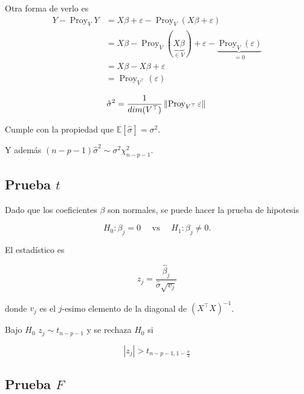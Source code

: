 \documentclass[
  12pt,
]{book}
\theoremstyle{definition}
\theoremstyle{definition}
\theoremstyle{definition}
\theoremstyle{remark}
\begin{document}
Otra forma de verlo es
\begin{align*}
Y-\operatorname{Proy}_{V}Y  
&= X\beta + \varepsilon -  \operatorname{Proy}_{V}( X\beta + \varepsilon) \\
&= X\beta - \operatorname{Proy}_{V}( \underbrace{X\beta}_{\in V}) + \varepsilon - \underbrace{\operatorname{Proy}_{V}( \varepsilon)}_{=0} \\
&= X\beta -X\beta + \varepsilon \\
&=  \operatorname{Proy}_{V^{\top}}( \varepsilon)
 \end{align*}

\begin{equation*}
\hat{\sigma}^{2} 
= \frac{1}{dim(V^{\top})}\left\Vert \operatorname{Proy}_{V^{\top}}\varepsilon\right\Vert \\
\end{equation*}

Cumple con la propiedad que \(\mathbb{E}\left[\hat{\sigma}^{}\right] = \sigma^{2}\).

Y además \((n-p-1)\hat{\sigma}^{2} \sim \sigma^{2} \chi^{2}_{n-p-1}.\)

\hypertarget{prueba-t}{%
\subsection{\texorpdfstring{Prueba \(t\)}{Prueba t}}\label{prueba-t}}

Dado que los coeficientes \(\beta\) son normales, se puede hacer la prueba de hipotesis

\begin{equation*}
 H_{0}: \beta_{j} = 0 \quad \text{ vs } \quad H_{1}:\beta_{j}\neq 0.
 \end{equation*}

El estadístico es

\begin{equation*}
 z_{j} = \frac{\hat{\beta}_{j}}{\hat{\sigma} \sqrt{v_{j}}} 
 \end{equation*}

donde \(v_{j}\) es el \(j\)-esimo elemento de la diagonal de \((X^{\top}X)^{-1}\).

Bajo \(H_{0}\) \(z_{j} \sim t_{n-p-1}\) y se rechaza \(H_{0}\) si

\begin{equation*}
 \left\vert z_{j} \right\vert > t_{n-p-1, 1-\frac{\alpha}{2}} 
 \end{equation*}

\hypertarget{prueba-f}{%
\subsection{\texorpdfstring{Prueba \(F\)}{Prueba F}}\label{prueba-f}}
\end{document}
